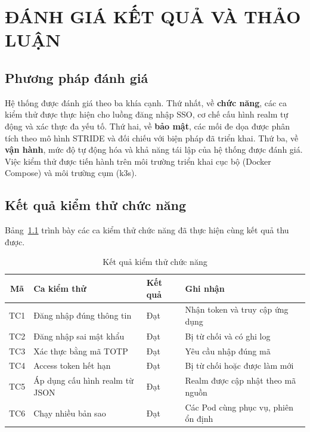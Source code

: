 \chapter{ĐÁNH GIÁ KẾT QUẢ VÀ THẢO LUẬN}
\label{ch:danhgia}

\section{Phương pháp đánh giá}
\label{sec:ppdg}

Hệ thống được đánh giá theo ba khía cạnh. Thứ nhất, về \textbf{chức năng}, các
ca kiểm thử được thực hiện cho luồng đăng nhập SSO, cơ chế cấu hình realm tự
động và xác thực đa yếu tố. Thứ hai, về \textbf{bảo mật}, các mối đe dọa được
phân tích theo mô hình STRIDE và đối chiếu với biện pháp đã triển khai. Thứ ba,
về \textbf{vận hành}, mức độ tự động hóa và khả năng tái lập của hệ thống được
đánh giá. Việc kiểm thử được tiến hành trên môi trường triển khai cục bộ (Docker
Compose) và môi trường cụm (k3s).

\section{Kết quả kiểm thử chức năng}
\label{sec:ketqua-cn}

Bảng~\ref{tab:testcases} trình bày các ca kiểm thử chức năng đã thực hiện cùng
kết quả thu được.

\begin{table}[htbp]
\centering
\caption{Kết quả kiểm thử chức năng}
\label{tab:testcases}
\small
\begin{tabular}{c p{4.4cm} p{2.4cm} p{4.0cm}}
\toprule
\textbf{Mã} & \textbf{Ca kiểm thử} & \textbf{Kết quả} & \textbf{Ghi nhận}\\
\midrule
TC1 & Đăng nhập đúng thông tin & Đạt & Nhận token và truy cập ứng dụng\\
TC2 & Đăng nhập sai mật khẩu & Đạt & Bị từ chối và có ghi log\\
TC3 & Xác thực bằng mã TOTP & Đạt & Yêu cầu nhập đúng mã\\
TC4 & Access token hết hạn & Đạt & Bị từ chối hoặc được làm mới\\
TC5 & Áp dụng cấu hình realm từ JSON & Đạt & Realm được cập nhật theo mã nguồn\\
TC6 & Chạy nhiều bản sao & Đạt & Các Pod cùng phục vụ, phiên ổn định\\
\bottomrule
\end{tabular}
\end{table}

